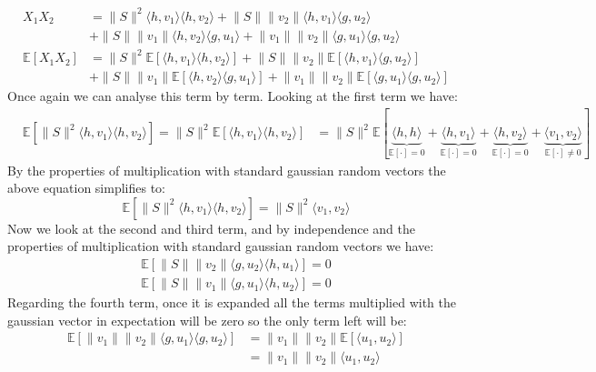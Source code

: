 \newcommand{\pexp}[1]{\mathds{E}\left[#1\right]}
\newcommand{\norm}[1]{\lVert #1 \rVert}
\newcommand{\dotprod}[1]{\langle #1 \rangle}
\begin{align*}
    X_1X_2 &= \lVert S \rVert^2 \langle h, v_1\rangle \langle h, v_2 \rangle + \lVert S \rVert \lVert v_2 \rVert \langle h, v_1 \rangle \langle g, u_2 \rangle \\ 
           &+\lVert S \rVert \lVert v_1 \rVert \langle h, v_2 \rangle \langle g, u_1 \rangle + \lVert v_1 \rVert \lVert v_2 \rVert \langle g, u_1 \rangle \langle g, u_2 \rangle \\
    \pexp{X_1X_2} &= \lVert S \rVert^2\pexp{\langle h, v_1 \rangle \langle h, v_2\rangle} + \lVert S \rVert \lVert v_2\rVert \pexp{\langle h, v_1 \rangle \langle g, u_2 \rangle} \\ 
                  &+ \lVert S \rVert \lVert v_1 \rVert \pexp{\langle h, v_2 \rangle \langle g, u_1 \rangle} + \lVert v_1 \rVert \lVert v_2 \rVert \pexp{\langle g, u_1 \rangle \langle g, u_2 \rangle}
\end{align*}
Once again we can analyse this term by term. Looking at the first term we have:
\begin{align*}
    &\pexp{\lVert S \rVert^2 \langle h, v_1 \rangle \langle h, v_2 \rangle} = \lVert S \rVert^2 \pexp{\langle h, v_1 \rangle \langle h, v_2 \rangle}
    &= \lVert S \rVert^2 \pexp{\underbrace{\langle h,h\rangle}_{\pexp{\cdot} = 0} + \underbrace{\langle h, v_1 \rangle}_{\pexp{\cdot} = 0} + \underbrace{\langle h, v_2 \rangle}_{\pexp{\cdot} = 0} + \underbrace{\langle v_1, v_2 \rangle}_{\pexp{\cdot} \neq 0}}
\end{align*}
By the properties of multiplication with standard gaussian random vectors the above equation simplifies to:
\begin{equation*}
    \pexp{\lVert S \rVert^2 \langle h, v_1 \rangle \langle h, v_2 \rangle} = \norm{S}^2\dotprod{v_1, v_2}
\end{equation*}
Now we look at the second and third term, and by independence and the properties of multiplication with standard gaussian random vectors we have:
\begin{align*}
    \pexp{\norm{S}\norm{v_2}\dotprod{g, u_2}\dotprod{h,u_1}} = 0 \\
    \pexp{\norm{S}\norm{v_1}\dotprod{g, u_1}\dotprod{h,u_2}} = 0 
\end{align*}
Regarding the fourth term, once it is expanded all the terms multiplied with the gaussian vector in expectation will be
zero so the only term left will be:
\begin{align*}
    \pexp{\norm{v_1}\norm{v_2}\dotprod{g, u_1}\dotprod{g, u_2}} &= \norm{v_1}\norm{v_2}\pexp{\dotprod{u_1, u_2}} \\
                                                                &= \norm{v_1}\norm{v_2}\dotprod{u_1, u_2}
\end{align*}
